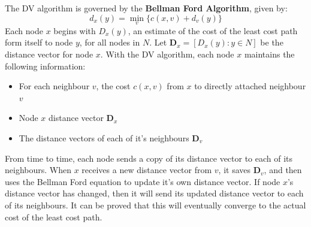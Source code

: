 \documentclass[12pt,letterpaper]{book}
\theoremstyle{definition}
\begin{document}
The DV algorithm is governed by the \textbf{Bellman Ford Algorithm}, given by:
\[d_x (y) = \min_v \{c(x,v) + d_v(y)\}\]
Each node $x$ begins with $D_x(y)$, an estimate of the cost of the least cost path form itself to node $y$, for all nodes in $N$. Let $\mathbf{D}_x = [D_x(y) : y \in N]$ be the distance vector for node $x$. With the DV algorithm, each node $x$ maintains the following information:
\begin{itemize}
  \item For each neighbour $v$, the cost $c(x,v)$ from $x$ to directly attached neighbour $v$
  \item Node $x$ distance vector $\mathbf{D}_x$
  \item The distance vectors of each of it's neighbours $\mathbf{D}_v$
\end{itemize}
From time to time, each node sends a copy of its distance vector to each of its neighbours. When $x$ receives a new distance vector from $v$, it saves $\mathbf{D}_v$, and then uses the Bellman Ford equation to update it's own distance vector.
If node $x$'s distance vector has changed, then it will send its updated distance vector to each of its neighbours. It can be proved that this will eventually converge to the actual cost of the least cost path.
\end{document}
